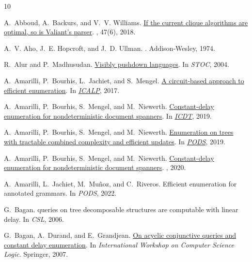 \begin{thebibliography}{10}

A.~Abboud, A.~Backurs, and V.~V. Williams.
\newblock \href{https://arxiv.org/abs/1504.01431}{If the current clique
  algorithms are optimal, so is {V}aliant's parser}.
, 47(6), 2018.

A.~V. Aho, J.~E. Hopcroft, and J.~D. Ullman.
.
\newblock Addison-Wesley, 1974.

R.~Alur and P.~Madhusudan.
\newblock
  \href{https://repository.upenn.edu/cgi/viewcontent.cgi?article=1174&context=cis_papers}{Visibly
  pushdown languages}.
\newblock In {\em STOC}, 2004.

A.~Amarilli, P.~Bourhis, L.~Jachiet, and S.~Mengel.
\newblock \href{https://arxiv.org/abs/1702.05589} {A circuit-based approach to
  efficient enumeration}.
\newblock In {\em \mbox{\href{http://icalp17.mimuw.edu.pl/}{ICALP}}}, 2017.

A.~Amarilli, P.~Bourhis, S.~Mengel, and M.~Niewerth.
\newblock \href{https://arxiv.org/abs/1807.09320} {Constant-delay enumeration
  for nondeterministic document spanners}.
\newblock In {\em \mbox{\href{http://edbticdt2019.inesc-id.pt/}{ICDT}}}, 2019.

A.~Amarilli, P.~Bourhis, S.~Mengel, and M.~Niewerth.
\newblock \href{https://arxiv.org/abs/1812.09519} {Enumeration on trees with
  tractable combined complexity and efficient updates}.
\newblock In {\em \mbox{\href{https://sigmod2019.org/}{PODS}}}, 2019.

A.~Amarilli, P.~Bourhis, S.~Mengel, and M.~Niewerth.
\newblock \href{https://arxiv.org/abs/2003.02576} {Constant-delay enumeration
  for nondeterministic document spanners}.
, 2020.

A.~Amarilli, L.~Jachiet, M.~Muñoz, and C.~Riveros.
\newblock Efficient enumeration for annotated grammars.
\newblock In {\em PODS}, 2022.

G.~Bagan.
 queries on tree decomposable structures are computable with
  linear delay.
\newblock In {\em CSL}, 2006.

G.~Bagan, A.~Durand, and E.~Grandjean.
\newblock
  \href{https://grandjean.users.greyc.fr/Recherche/PublisGrandjean/EnumAcyclicCSL07.pdf}{On
  acyclic conjunctive queries and constant delay enumeration}.
\newblock In {\em International Workshop on Computer Science Logic}. Springer,
  2007.


\end{thebibliography}
